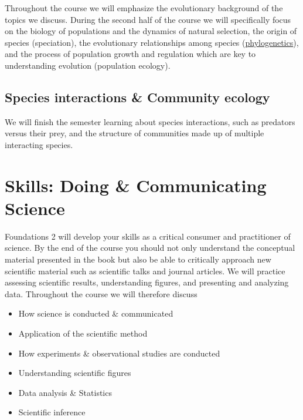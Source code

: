 \documentclass[
]{book}
\providecommand{\tightlist}{%
  \setlength{\itemsep}{0pt}\setlength{\parskip}{0pt}}
\begin{document}
Throughout the course we will emphasize the evolutionary background of the topics we discuss. During the second half of the course we will specifically focus on the biology of populations and the dynamics of natural selection, the origin of species (speciation), the evolutionary relationships among species (\href{https://en.wikipedia.org/wiki/Phylogenetics}{phylogenetics}), and the process of population growth and regulation which are key to understanding evolution (population ecology).

\hypertarget{species-interactions-community-ecology}{%
\subsection{Species interactions \& Community ecology}\label{species-interactions-community-ecology}}

We will finish the semester learning about species interactions, such as predators versus their prey, and the structure of communities made up of multiple interacting species.

\hypertarget{skills-doing-communicating-science}{%
\section{Skills: Doing \& Communicating Science}\label{skills-doing-communicating-science}}

Foundations 2 will develop your skills as a critical consumer and practitioner of science. By the end of the course you should not only understand the conceptual material presented in the book but also be able to critically approach new scientific material such as scientific talks and journal articles. We will practice assessing scientific results, understanding figures, and presenting and analyzing data. Throughout the course we will therefore discuss

\begin{itemize}
\tightlist
\item
  How science is conducted \& communicated
\item
  Application of the scientific method
\item
  How experiments \& observational studies are conducted
\item
  Understanding scientific figures
\item
  Data analysis \& Statistics
\item
  Scientific inference
\end{itemize}
\end{document}
